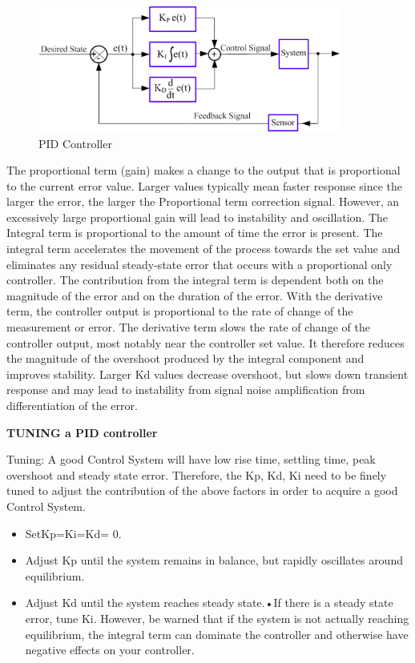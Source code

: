 \documentclass{article}
\begin{document}
 	
 	\begin{figure}[h]
 		\centering
 		\includegraphics[width=100mm,scale=0.5]{PIDcontrol}
 		\caption{PID Controller}
 		\label{Fig.6: PID Controller}
 	\end{figure}
 	
 	The proportional term (gain) makes a change to the output that is proportional to the current error value. Larger values typically mean faster response since the larger the error, the larger the Proportional term correction signal. However, an excessively large proportional gain will lead to instability and oscillation.
 	The Integral term is proportional to the amount of time the error is present. The integral term accelerates the movement of the process towards the set value and eliminates any residual steady-state error that occurs with a proportional only controller. The contribution from the integral term is dependent both on the magnitude of the error and on the duration of the error.
 	With the derivative term, the controller output is proportional to the rate of change of the measurement or error. The derivative term slows the rate of change of the controller output, most notably near the controller set value. It therefore reduces the magnitude of the overshoot produced by the integral component and improves stability. Larger Kd values decrease overshoot, but slows down transient response and may lead to instability from signal noise amplification from differentiation of the error.\\	
 		
 	
	\pagebreak
 
 	\textbf{TUNING a PID controller}
 	
 	Tuning: A good Control System will have low rise time, settling time, peak overshoot and steady state error. Therefore, the Kp, Kd, Ki need to be ﬁnely tuned to adjust the contribution of the above factors in order to acquire a good Control System.
 	
 	\begin{itemize}
 	\item SetKp=Ki=Kd= 0.
 	\item Adjust Kp until the system remains in balance, but rapidly oscillates around equilibrium.
 	\item Adjust Kd until the system reaches steady state.•If there is a steady state error, tune Ki. However, be warned that if the system is not actually reaching equilibrium, the integral term can dominate the controller and otherwise have negative effects on your controller.
 	\end{itemize}
 
\end{document}
